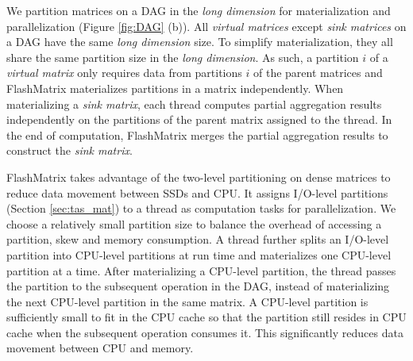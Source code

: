 We partition matrices on a DAG in the \textit{long dimension} for materialization
and parallelization (Figure \ref{fig:DAG} (b)). All \textit{virtual matrices}
except \textit{sink matrices} on a DAG have the same \textit{long dimension}
size. To simplify materialization, they all share the same partition size in
the \textit{long dimension}.
As such, a partition $i$ of a \textit{virtual matrix} only requires data from
partitions $i$ of the parent matrices and FlashMatrix materializes partitions
in a matrix independently. %
When materializing a \textit{sink matrix}, each thread computes partial
aggregation results independently on the partitions of the parent matrix
assigned to the thread. In the end of computation, FlashMatrix merges
the partial aggregation results to construct the \textit{sink matrix}.


FlashMatrix takes advantage of the two-level
partitioning on dense matrices to reduce data movement between SSDs and CPU.
It assigns I/O-level partitions (Section \ref{sec:tas_mat}) to a thread as
computation tasks for parallelization. We choose a relatively small partition
size to balance the overhead of accessing a partition, skew
and memory consumption. A thread further splits an I/O-level partition into
CPU-level partitions at run time and materializes one CPU-level partition at
a time. After materializing a CPU-level partition, the thread passes
the partition to the subsequent operation in the DAG, instead of materializing
the next CPU-level
partition in the same matrix. A CPU-level partition is sufficiently small
to fit in the CPU cache so that the partition still resides in CPU cache when
the subsequent operation consumes it. This significantly reduces data movement
between CPU and memory.

